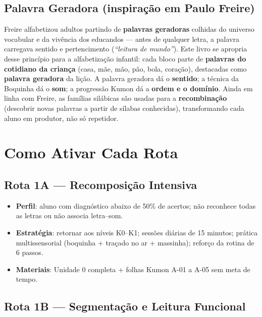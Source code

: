 \rotasindividualizadas

\subsection{Palavra Geradora (inspira\c{c}\~ao em Paulo Freire)}

Freire alfabetizou adultos partindo de \textbf{palavras geradoras} colhidas do
universo vocabular e da viv\^encia dos educandos --- antes de qualquer letra, a
palavra carregava sentido e pertencimento (\textit{``leitura de mundo''}).
Este livro se apropria desse princ\'ipio para a alfabetiza\c{c}\~ao infantil:
cada bloco parte de \textbf{palavras do cotidiano da crian\c{c}a} (casa, m\~ae,
m\~ao, p\~ao, bola, cora\c{c}\~ao), destacadas como \textbf{palavra geradora}
da li\c{c}\~ao. A palavra geradora d\'a o \textbf{sentido}; a t\'ecnica da
Boquinha d\'a o \textbf{som}; a progress\~ao Kumon d\'a a \textbf{ordem e o
dom\'inio}. Ainda em linha com Freire, as fam\'ilias sil\'abicas s\~ao usadas
para a \textbf{recombina\c{c}\~ao} (descobrir novas palavras a partir de
s\'ilabas conhecidas), transformando cada aluno em produtor, n\~ao s\'o
repetidor.

\section{Como Ativar Cada Rota}

\subsection{Rota 1A --- Recomposição Intensiva}

\begin{itemize}
  \item \textbf{Perfil}: aluno com diagnóstico abaixo de 50\% de acertos; não reconhece todas as letras ou não associa letra--som.
  \item \textbf{Estratégia}: retornar aos níveis K0--K1; sessões diárias de 15 minutos; prática multissensorial (boquinha + traçado no ar + massinha); reforço da rotina de 6 passos.
  \item \textbf{Materiais}: Unidade 0 completa + folhas Kumon A-01 a A-05 sem meta de tempo.
\end{itemize}

\subsection{Rota 1B --- Segmentação e Leitura Funcional}

